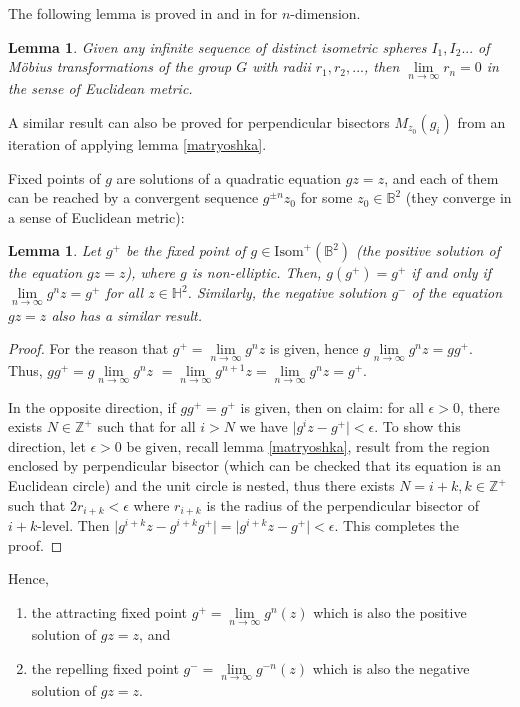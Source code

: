 \documentclass[12pt,oneside]{sfsuthesis}
\theoremstyle{plain} %
\newtheorem{lemma}[theorem]{Lemma}
\theoremstyle{definition}  %
\theoremstyle{remark}  %
\theoremstyle{plain}
\begin{document}
{The following lemma is proved in \cite[Theorem 3.3.7]{katok1992fuchsian} and in \cite{cano2013complex} for $n$-dimension.
\begin{lemma}\label{converges to zero}
Given any infinite sequence of distinct isometric spheres $I_1,I_2...$ of M\"{o}bius transformations of the group $G$ with radii $r_1,r_2,...$, then $\lim\limits_{n\to\infty}r_n=0$ in the sense of Euclidean metric.
\end{lemma}
A similar result can also be proved for perpendicular bisectors $M_{z_0}(g_i)$ from an iteration of applying lemma \ref{matryoshka}.

Fixed points of $g$ are solutions of a quadratic equation $gz=z$, and each of them can be reached by a convergent sequence $g^{\pm n}z_0$ for some $z_0\in \mathbb{B}^2$ (they converge in a sense of Euclidean metric):

\begin{lemma}\label{my radius convergence}
Let $g^+$ be the fixed point of $g\in\text{Isom}^+(\mathbb{B}^2)$ (the positive solution of the equation $gz=z$), where $g$ is non-elliptic. Then, $g(g^+)=g^+$ if and only if $\lim\limits_{n\to\infty}g^nz=g^+$ for all $z\in\mathbb{H}^2$. Similarly, the negative solution $g^-$ of the equation $gz=z$ also has a similar result.
\end{lemma}
\begin{proof}
For the reason that $g^+=\lim\limits_{n\to\infty}g^nz$ is given, hence $g\lim\limits_{n\to\infty}g^nz=gg^+.$ Thus, $gg^+=g\lim\limits_{n\to\infty}g^nz$ $=\lim\limits_{n\to\infty}g^{n+1}z=\lim\limits_{n\to\infty}g^nz=g^+$.

In the opposite direction, if $gg^+=g^+$ is given, then on claim: for all $\epsilon>0$, there exists $N\in\mathbb{Z}^+$ such that for all $i>N$ we have $\vert g^iz-g^+ \vert<\epsilon$. To show this direction, let $\epsilon>0$ be given, recall lemma \ref{matryoshka}, result from the region enclosed by perpendicular bisector (which can be checked that its equation is an Euclidean circle) and the unit circle is nested, thus there exists $N=i+k,k\in\mathbb{Z}^+$ such that $2r_{i+k}<\epsilon$ where $r_{i+k}$ is the radius of the perpendicular bisector of $i+k$-level. Then $\vert g^{i+k}z-g^{i+k}g^+\vert=\vert g^{i+k}z-g^+\vert<\epsilon$. This completes the proof.
\end{proof}

Hence, 
\begin{enumerate}
\item the attracting fixed point $g^{+}=\lim\limits_{n\to \infty}g^{n}(z)$ which is also the positive solution of $gz=z$, and
\item the repelling fixed point $g^{-}=\lim\limits_{n\to \infty}g^{-n}(z)$ which is also the negative solution of $gz=z$.
\end{enumerate}


}
\end{document}
